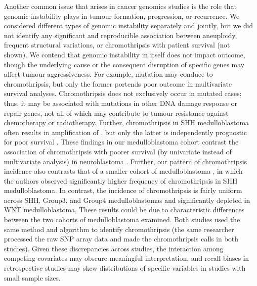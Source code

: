 Another common issue that arises in cancer genomics studies is the role that genomic instability plays in tumour formation, progression, or recurrence. We considered different types of genomic instability separately and jointly, but we did not identify any significant and reproducible association between aneuploidy, frequent structural variations, or chromothripsis with patient survival (not shown). We contend that genomic instability in itself does not impact outcome, though the underlying cause or the consequent disruption of specific genes may affect tumour aggressiveness. For example,  mutation may conduce to chromothripsis, but only the former portends poor outcome in multivariate survival analyses. Chromothripsis does not exclusively occur in  mutated cases; thus, it may be associated with mutations in other DNA damage response or repair genes, not all of which may contribute to tumour resistance against chemotherapy or radiotherapy. Further, chromothripsis in SHH medulloblastoma often results in amplification of , but only the latter is independently prognostic for poor survival . These findings in our medulloblastoma cohort contrast the association of chromothripsis with poorer survival (by univariate instead of multivariate analysis) in neuroblastoma . Further, our pattern of chromothripsis incidence also contrasts that of a smaller cohort of medulloblastoma , in which the authors observed significantly higher frequency of chromothripsis in SHH medulloblastoma. In contrast, the incidence of chromothripsis is fairly uniform across SHH, Group3, and Group4 medulloblastomas and significantly depleted in WNT medulloblastoma, These results could be due to characteristic differences between the two cohorts of medulloblastoma examined. Both studies used the same method and algorithm to identify chromothripsis (the same researcher processed the raw SNP array data and made the chromothripsis calls in both studies). Given these discrepancies across studies, the interaction among competing covariates may obscure meaningful interpretation, and recall biases in retrospective studies may skew distributions of specific variables in studies with small sample sizes.

